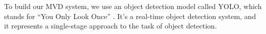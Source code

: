 \documentclass[14pt,a4paper]{extarticle}
\newcounter{e}
\numberwithin{equation}{section}
\numberwithin{figure}{section}
\begin{document}

To build our MVD system, we use an object detection model called YOLO, which stands for ``You Only Look Once'' \cite{yolov5}. It's a real-time object detection system, and it represents a single-stage approach to the task of object detection.
\end{document}
